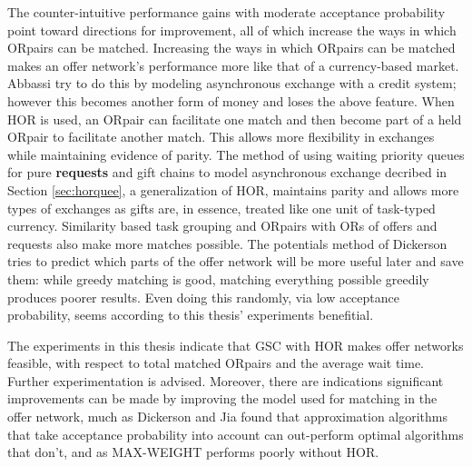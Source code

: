 \documentclass[main.tex]{subfiles}
\begin{document}
The counter-intuitive performance gains with moderate acceptance probability point toward directions for improvement, all of which increase the ways in which ORpairs can be matched. Increasing the ways in which ORpairs can be matched makes an offer network's performance more like that of a currency-based market. Abbassi \cite{Abb2} try to do this by modeling asynchronous exchange with a credit system; however this becomes another form of money and loses the above feature. When HOR is used, an ORpair can facilitate one match and then become part of a held ORpair to facilitate another match. This allows more flexibility in exchanges while maintaining evidence of parity. The method of using waiting priority queues for pure \textbf{requests} and gift chains to model asynchronous exchange decribed in Section \ref{sec:horquee}, a generalization of HOR, maintains parity and allows more types of exchanges as gifts are, in essence, treated like one unit of task-typed currency. Similarity based task grouping and ORpairs with ORs of offers and requests also make more matches possible. The potentials method of Dickerson \cite{Dick} tries to predict which parts of the offer network will be more useful later and save them: while greedy matching is good, matching everything possible greedily produces poorer results. Even doing this randomly, via low acceptance probability, seems according to this thesis' experiments benefitial.

The experiments in this thesis indicate that GSC with HOR makes offer networks feasible, with respect to total matched ORpairs and the average wait time. Further experimentation is advised. Moreover, there are indications significant improvements can be made by improving the model used for matching in the offer network, much as Dickerson \cite{Dick} \cite{Dick3} and Jia \cite{Jia1} found that approximation algorithms that take acceptance probability into account can out-perform optimal algorithms that don't, and as MAX-WEIGHT performs poorly without HOR.
\end{document}
